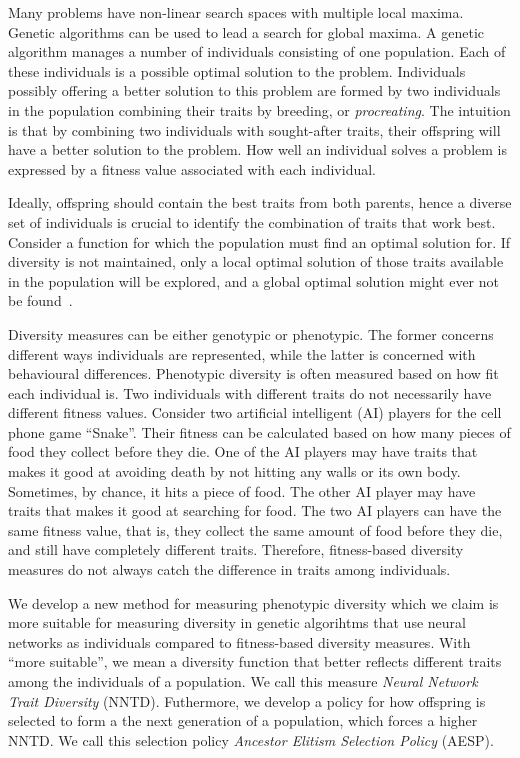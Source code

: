 Many problems have non-linear search spaces with multiple local maxima. Genetic algorithms can be used to lead a search for global maxima. A genetic algorithm manages a number of individuals consisting of one population. Each of these individuals is a possible optimal solution to the problem. Individuals possibly offering a better solution to this problem are formed by two individuals in the population combining their traits by breeding, or \emph{procreating}. The intuition is that by combining two individuals with sought-after traits, their offspring will have a better solution to the problem. How well an individual solves a problem is expressed by a fitness value associated with each individual. 

Ideally, offspring should contain the best traits from both parents, hence a diverse set of individuals is crucial to identify the combination of traits that work best. Consider a function for which the population must find an optimal solution for. If diversity is not maintained, only a local optimal solution of those traits available in the population will be explored, and a global optimal solution might ever not be found~\cite{ursem2002diversity}.

Diversity measures can be either genotypic or phenotypic. The former concerns different ways individuals are represented, while the latter is concerned with behavioural differences. Phenotypic diversity is often measured based on how fit each individual is. Two individuals with different traits do not necessarily have different fitness values. Consider two artificial intelligent (AI) players for the cell phone game ``Snake''. Their fitness can be calculated based on how many pieces of food they collect before they die. One of the AI players may have traits that makes it good at avoiding death by not hitting any walls or its own body. Sometimes, by chance, it hits a piece of food. The other AI player may have traits that makes it good at searching for food. The two AI players can have the same fitness value, that is, they collect the same amount of food before they die, and still have completely different traits. Therefore, fitness-based diversity measures do not always catch the difference in traits among individuals.

We develop a new method for measuring phenotypic diversity which we claim is more suitable for measuring diversity in genetic algorihtms that use neural networks as individuals compared to fitness-based diversity measures. With ``more suitable'', we mean a diversity function that better reflects different traits among the individuals of a population. We call this measure \emph{Neural Network Trait Diversity} (NNTD). Futhermore, we develop a policy for how offspring is selected to form a the next generation of a population, which forces a higher NNTD\@. We call this selection policy \emph{Ancestor Elitism Selection Policy} (AESP).


